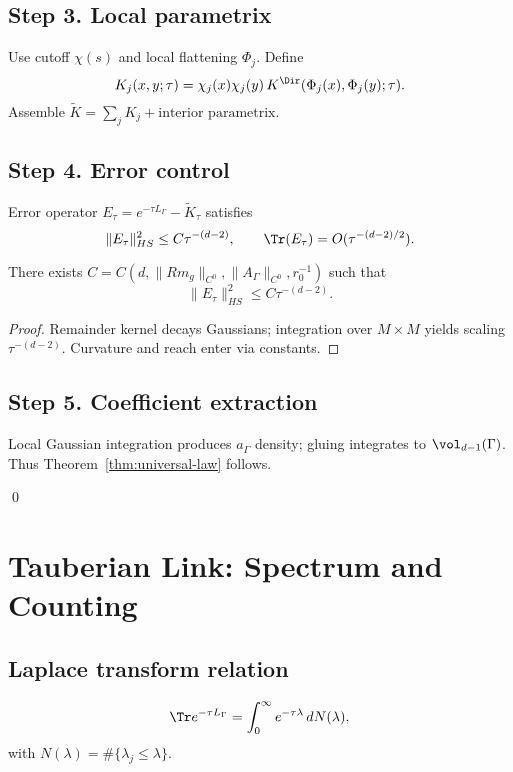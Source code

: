 \subsection{Step 3. Local parametrix}
Use cutoff $\chi(s)$ and local flattening $\Phi_j$.
Define
\[
K_j(x,y;\tau)=\chi_j(x)\chi_j(y)\,K^\Dir(\Phi_j(x),\Phi_j(y);\tau).
\]
Assemble $\tilde K=\sum_j K_j+\text{interior parametrix}$.

\subsection{Step 4. Error control}
Error operator $E_\tau=e^{-\tau L_\Gamma}-\tilde K_\tau$ satisfies
\[
\|E_\tau\|_{HS}^2\le C\tau^{-(d-2)},\qquad \Tr(E_\tau)=O(\tau^{-(d-2)/2}).
\]

\begin{lemma}[HS-bound]\label{lem:HS}
There exists $C=C(d,\|Rm_g\|_{C^0},\|A_\Gamma\|_{C^0},r_0^{-1})$ such that
\[
\|E_\tau\|_{HS}^2\le C\tau^{-(d-2)}.
\]
\end{lemma}

\begin{proof}
Remainder kernel decays Gaussians; integration over $M\times M$ yields scaling $\tau^{-(d-2)}$. Curvature and reach enter via constants.
\end{proof}

\subsection{Step 5. Coefficient extraction}
Local Gaussian integration produces $a_\Gamma$ density; gluing integrates to $\vol_{d-1}(\Gamma)$. Thus Theorem~\ref{thm:universal-law} follows.

\qed

\section{Tauberian Link: Spectrum and Counting}
\label{sec:tauberian}

\subsection{Laplace transform relation}
\[
\Tr e^{-\tau L_\Gamma}=\int_0^\infty e^{-\tau\lambda}\,dN(\lambda),
\]
with $N(\lambda)=\#\{\lambda_j\le\lambda\}$.

